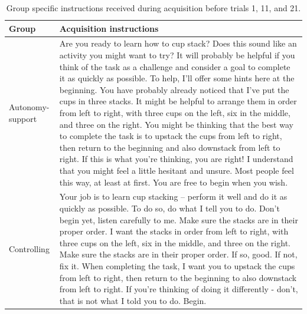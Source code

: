 \documentclass[man,floatsintext,donotrepeattitle,letterpaper,12pt]{apa7}
\begin{document}
\begin{table}[htb]
    \caption{Group speciﬁc instructions received during acquisition before trials 1, 11, and 21.}
    \label{tab:table2}
    \small
    \begin{tabular}{@{}p{1.4in}p{4.75in}@{}}
    \toprule
    Group            & Acquisition instructions \\
    \midrule
    Autonomy-support & Are you ready to learn how to cup stack? Does this sound like an activity you might want to try? It will probably be helpful if you think of the task as a challenge and consider a goal to complete it as quickly as possible. To help, I'll offer some hints here at the beginning. You have probably already noticed that I've put the cups in three stacks. It might be helpful to arrange them in order from left to right, with three cups on the left, six in the middle, and three on the right. You might be thinking that the best way to complete the task is to upstack the cups from left to right, then return to the beginning and also downstack from left to right. If this is what you're thinking, you are right! I understand that you might feel a little hesitant and unsure. Most people feel this way, at least at first. You are free to begin when you wish. \\
    \addlinespace[0.5em]
    Controlling      & Your job is to learn cup stacking -- perform it well and do it as quickly as possible. To do so, do what I tell you to do. Don't begin yet, listen carefully to me. Make sure the stacks are in their proper order. I want the stacks in order from left to right, with three cups on the left, six in the middle, and three on the right. Make sure the stacks are in their proper order. If so, good. If not, fix it. When completing the task, I want you to upstack the cups from left to right, then return to the beginning to also downstack from left to right. If you're thinking of doing it differently - don't, that is not what I told you to do. Begin. \\
    \bottomrule
    \end{tabular}
\end{table}
\end{document}
